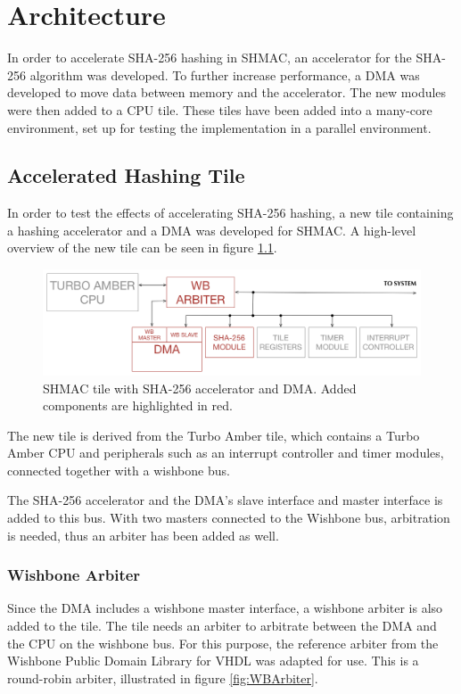 \chapter{Architecture}
\label{cha:architecture}
In order to accelerate SHA-256 hashing in SHMAC, an accelerator for the SHA-256 algorithm
was developed. To further increase performance, a DMA was developed to move data between
memory and the accelerator. The new modules were then added to a CPU tile. These tiles have been added into a many-core environment, set up for testing the implementation in a parallel environment.

\section{Accelerated Hashing Tile}
\label{sec:aht}

In order to test the effects of accelerating SHA-256 hashing, a new tile containing a hashing
accelerator and a DMA was developed for SHMAC. A high-level overview of the new tile can be
seen in figure \ref{fig:SHA-Tile}.

\begin{figure}[htb]
    \centering
    \includegraphics[width=1.0\textwidth]{Figures/Tile/HashingTile}
    \caption{SHMAC tile with SHA-256 accelerator and DMA. Added components are highlighted in red.}
    \label{fig:SHA-Tile}
\end{figure}

The new tile is derived from the Turbo Amber tile, which contains
a Turbo Amber CPU and peripherals such as an interrupt controller and timer modules, connected
together with a wishbone bus.

The SHA-256 accelerator and the DMA's slave interface and master interface is added to this bus.
With two masters connected to the Wishbone bus, arbitration is needed, thus an arbiter has been added as well.

\subsection{Wishbone Arbiter}
Since the DMA includes a wishbone master interface, a wishbone arbiter is also added to the tile.
The tile needs an arbiter to arbitrate between the DMA and the CPU on the wishbone bus.
For this purpose, the reference arbiter from the Wishbone Public Domain Library for VHDL %
was adapted for use. This is a round-robin arbiter, illustrated in figure \ref{fig:WBArbiter}.

